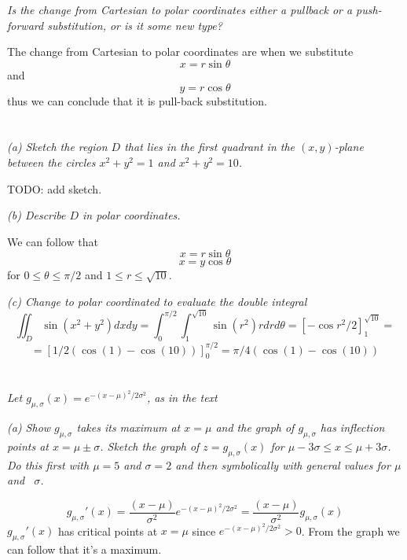 \documentclass[11pt,oneside,titlepage]{book}
\begin{document}
\section{}

\textit{Is the change from Cartesian to polar coordinates either a pullback or a push-forward
  substitution, or is it some new type?}

The change from Cartesian to polar coordinates are when we substitute
$$x = r \sin\theta $$
and
$$y = r \cos \theta$$
thus we can conclude that it is pull-back substitution.

\section{}

\textit{(a) Sketch the region $D$ that lies in the first quadrant in the $(x,y)$-plane
  between the circles $x^2 + y^2 = 1$ and $x^2 + y^2 = 10$.}

TODO: add sketch.

\textit{(b) Describe $D$ in polar coordinates.}

We can follow that
$$x = r \sin \theta$$
$$x = y \cos \theta$$
for $0 \leq \theta \leq \pi/2$ and $1 \leq r \leq \sqrt{10}$.

\textit{(c) Change to polar coordinated to evaluate the double integral}
$$\iint_D{\sin{(x^2 + y^2)} dx dy}=
\int_0^{\pi/2}{\int_1^{\sqrt{10}}{\sin{(r^2)r dr}  d\theta}}= [-\cos{r^2}/2]_1^{\sqrt{10}} = $$
$$=  [1/2(\cos(1) - \cos(10))]_0^{\pi/2} = \pi/4(\cos(1) - \cos(10)) $$

\section{}

\textit{Let $g_{\mu, \sigma}(x) = e^{-(x - \mu)^2/2\sigma^2}$, as in the text}

\textit{(a) Show $g_{\mu, \sigma}$ takes its maximum  at $x = \mu$ and  the graph of
  $g_{\mu, \sigma}$ has inflection points at $x = \mu \pm \sigma$. Sketch the graph
  of $z = g_{\mu, \sigma}(x)$ for $\mu - 3 \sigma \leq x \leq \mu + 3\sigma$. Do this first
  with $\mu = 5$ and $\sigma = 2$ and then symbolically with general values for $\mu$ and \
  $\sigma$.}

$$g_{\mu, \sigma}'(x) = \frac{(x - \mu)}{\sigma^2} e^{-(x - \mu)^2/2\sigma^2} =
\frac{(x - \mu)}{\sigma^2} g_{\mu, \sigma}(x)$$
$g_{\mu, \sigma}'(x)$ has critical points at $x = \mu$ since $e^{-(x - \mu)^2/2\sigma^2} > 0$. From
the graph we can follow that it's a maximum.
\end{document}
